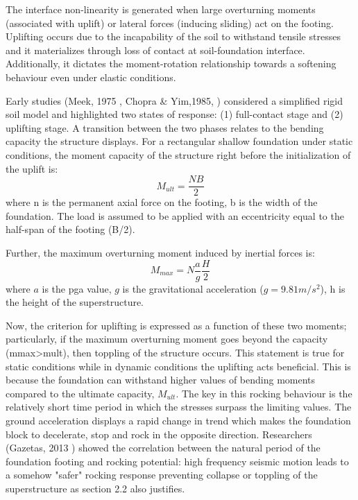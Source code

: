 \documentclass[11pt,a4paper]{report}
\begin{document}
The interface non-linearity is generated when large overturning moments (associated with uplift) or lateral forces (inducing sliding) act on the footing. Uplifting occurs due to the incapability of the soil to withstand tensile stresses and it materializes through loss of contact at soil-foundation interface. Additionally, it dictates the moment-rotation relationship towards a softening behaviour even under elastic conditions.

Early studies (Meek, 1975 \cite{meek1975effects}, Chopra \& Yim,1985,  \cite{chopra1985simplified}) considered a simplified rigid soil model and highlighted two states of response: (1) full-contact stage and (2) uplifting stage. A transition between the two phases relates to the bending capacity the structure displays. For a rectangular shallow foundation under static conditions, the moment capacity of the structure right before the initialization of the uplift is:
\begin{equation}
	M_{ult}= \frac{N B}{2}
\end{equation}
 where \gls{n} is the permanent axial force on the footing, \gls{b} is the width of the foundation. The load is assumed to be applied with an eccentricity equal to the half-span of the footing (B/2). 
 
 Further, the maximum overturning moment induced by inertial forces is:
 \begin{equation}
 	M_{max}= N \frac{a}{g}\frac{H}{2}
 \end{equation}
where $a$ is the \gls{pga} value, $g$ is the gravitational acceleration ($g=9.81m/s^2$), \gls{h} is the height of the superstructure.

Now, the criterion for uplifting is expressed as a function of these two moments; particularly, if the maximum overturning moment goes beyond the capacity (\gls{mmax}>\gls{mult}), then toppling of the structure occurs. This statement is true for static conditions while in dynamic conditions the uplifting acts beneficial. This is because the foundation can withstand higher values of bending moments compared to the ultimate capacity, $M_{ult}$. The key in this rocking behaviour is the relatively short time period in which the stresses surpass the limiting values. The ground acceleration displays a rapid change in trend which makes the foundation block to decelerate, stop and rock in the opposite direction. Researchers (Gazetas, 2013 \cite{gazetas2013can}) showed the correlation between the natural period of the foundation footing and rocking potential: high frequency seismic motion leads to a somehow "safer" rocking response preventing collapse or toppling of the superstructure as section 2.2 also justifies.
\end{document}
